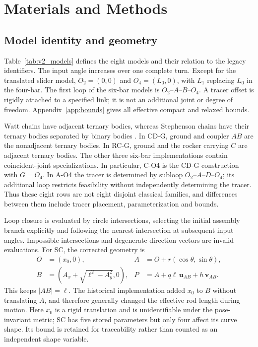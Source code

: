 \documentclass[applsci,article,submit,pdftex,moreauthors]{Definitions/mdpi}
\begin{document}
\section{Materials and Methods}
\subsection{Model identity and geometry}\label{sec:models}
Table~\ref{tab:v2_models} defines the eight models and their relation to the legacy identifiers. The input angle increases over one complete turn. Except for the translated slider model, $O_2=(0,0)$ and $O_4=(L_0,0)$, with $L_1$ replacing $L_0$ in the four-bar. The first loop of the six-bar models is $O_2$--$A$--$B$--$O_4$. A tracer offset is rigidly attached to a specified link; it is not an additional joint or degree of freedom. Appendix~\ref{app:bounds} gives all effective compact and relaxed bounds.



Watt chains have adjacent ternary bodies, whereas Stephenson chains have their ternary bodies separated by binary bodies \cite{Plecnik2016b}. In CD-G, ground and coupler $AB$ are the nonadjacent ternary bodies. In RC-G, ground and the rocker carrying $C$ are adjacent ternary bodies. The other three six-bar implementations contain coincident-joint specializations. In particular, C-O4 is the CD-G construction with $G=O_4$. In A-O4 the tracer is determined by subloop $O_2$--$A$--$D$--$O_4$; its additional loop restricts feasibility without independently determining the tracer. Thus these eight rows are not eight disjoint classical families, and differences between them include tracer placement, parameterization and bounds.

Loop closure is evaluated by circle intersections, selecting the initial assembly branch explicitly and following the nearest intersection at subsequent input angles. Impossible intersections and degenerate direction vectors are invalid evaluations. For SC, the corrected geometry is
\begin{align}
 O&=(x_0,0),& A&=O+r(\cos\theta,\sin\theta),\\
 B&=(A_x+\sqrt{\ell^2-A_y^2},0),&
 P&=A+q\ell\,\mathbf u_{AB}+h\,\mathbf v_{AB}.
\end{align}
This keeps $|AB|=\ell$. The historical implementation added $x_0$ to $B$ without translating $A$, and therefore generally changed the effective rod length during motion. Here $x_0$ is a rigid translation and is unidentifiable under the pose-invariant metric; SC has five stored parameters but only four affect its curve shape. Its bound is retained for traceability rather than counted as an independent shape variable.
\end{document}
